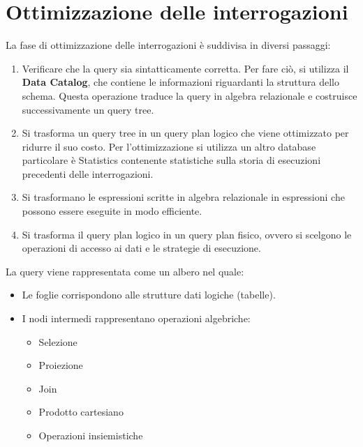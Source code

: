 \section{Ottimizzazione delle interrogazioni}
La fase di ottimizzazione delle interrogazioni è suddivisa in diversi passaggi:
\begin{enumerate}
      \item Verificare che la query sia sintatticamente corretta. Per fare ciò,
            si utilizza il \textbf{Data Catalog}, che contiene le informazioni
            riguardanti la struttura dello schema.
            Questa operazione traduce la query in algebra relazionale e costruisce
            successivamente un query tree.
      \item Si trasforma un query tree in un query plan logico che viene ottimizzato
            per ridurre il suo costo. Per l'ottimizzazione si utilizza un altro
            database particolare è Statistics contenente statistiche sulla storia
            di esecuzioni precedenti delle interrogazioni.
      \item Si trasformano le espressioni scritte in algebra relazionale in
            espressioni che possono essere eseguite in modo efficiente.
      \item Si trasforma il query plan logico in un query plan fisico, ovvero
            si scelgono le operazioni di accesso ai dati e le strategie di
            esecuzione.
\end{enumerate}
\begin{definizione}
      La query viene rappresentata come un albero nel quale:
      \begin{itemize}
            \item Le foglie corrispondono alle strutture dati logiche (tabelle).
            \item I nodi intermedi rappresentano operazioni algebriche:
                  \begin{itemize}
                        \item Selezione
                        \item Proiezione
                        \item Join
                        \item Prodotto cartesiano
                        \item Operazioni insiemistiche
                  \end{itemize}
      \end{itemize}
\end{definizione}
